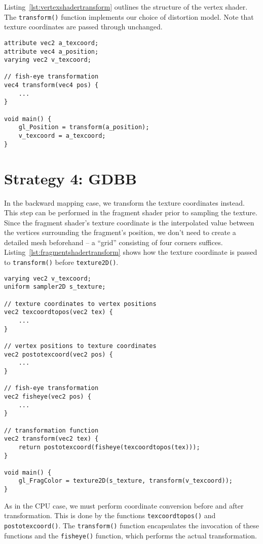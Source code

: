 \documentclass[english,12pt]{ifimaster}
\begin{document}
Listing~\ref{lst:vertexshadertransform} outlines the structure of the
vertex shader. The \lstinline|transform()| function implements our
choice of distortion model. Note that texture coordinates are passed
through unchanged.

\begin{lstlisting}[frame=lines,label=lst:vertexshadertransform,caption=Transformation in the vertex shader]
attribute vec2 a_texcoord;
attribute vec4 a_position;
varying vec2 v_texcoord;

// fish-eye transformation
vec4 transform(vec4 pos) {
    ...
}

void main() {
    gl_Position = transform(a_position);
    v_texcoord = a_texcoord;
}
\end{lstlisting}

\section{Strategy 4: GDBB}

In the backward mapping case, we transform the texture coordinates
instead. This step can be performed in the fragment shader prior to
sampling the texture. Since the fragment shader's texture coordinate
is the interpolated value between the vertices surrounding the
fragment's position, we don't need to create a detailed mesh
beforehand -- a ``grid'' consisting of four corners suffices.
Listing~\ref{lst:fragmentshadertransform} shows how the texture
coordinate is passed to \lstinline|transform()| before
\lstinline|texture2D()|.

\begin{lstlisting}[frame=lines,label=lst:fragmentshadertransform,caption=Transformation in the fragment shader]
varying vec2 v_texcoord;
uniform sampler2D s_texture;

// texture coordinates to vertex positions
vec2 texcoordtopos(vec2 tex) {
    ...
}

// vertex positions to texture coordinates
vec2 postotexcoord(vec2 pos) {
    ...
}

// fish-eye transformation
vec2 fisheye(vec2 pos) {
    ...
}

// transformation function
vec2 transform(vec2 tex) {
    return postotexcoord(fisheye(texcoordtopos(tex)));
}

void main() {
    gl_FragColor = texture2D(s_texture, transform(v_texcoord));
}
\end{lstlisting}

As in the CPU case, we must perform coordinate conversion before and
after transformation. This is done by the functions
\lstinline|texcoordtopos()| and \lstinline|postotexcoord()|. The
\lstinline|transform()| function encapsulates the invocation of these
functions and the \lstinline|fisheye()| function, which performs the
actual transformation.
\end{document}
